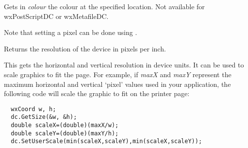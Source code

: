 \label{wxdcgetpixel}


Gets in {\it colour} the colour at the specified location.
Not available for wxPostScriptDC or wxMetafileDC.

Note that setting a pixel can be done using .



\label{wxdcgetppi}


Returns the resolution of the device in pixels per inch.

\label{wxdcgetsize}



This gets the horizontal and vertical resolution in device units. It can be used to scale graphics to fit the page.
For example, if {\it maxX} and {\it maxY}\rtfsp
represent the maximum horizontal and vertical `pixel' values used in your
application, the following code will scale the graphic to fit on the
printer page:

\begin{verbatim}
  wxCoord w, h;
  dc.GetSize(&w, &h);
  double scaleX=(double)(maxX/w);
  double scaleY=(double)(maxY/h);
  dc.SetUserScale(min(scaleX,scaleY),min(scaleX,scaleY));
\end{verbatim}




